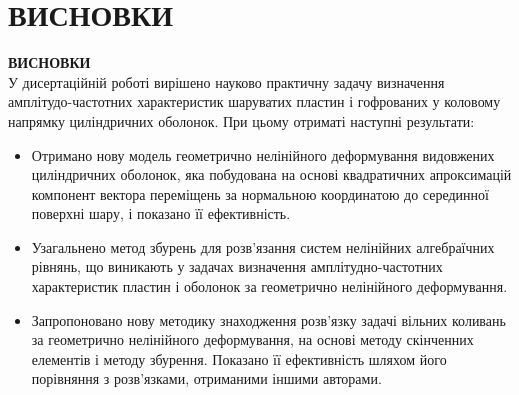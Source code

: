 \documentclass[8pt]{beamer}
\numberwithin{figure}{section}
\numberwithin{equation}{section}
\numberwithin{table}{section}
\begin{document}
\section{ВИСНОВКИ}
\begin{frame}
\textbf{\large ВИСНОВКИ}
\\
\vspace{0.2em}
У дисертаційній роботі вирішено науково практичну задачу визначення амплітудо-частотних характеристик шаруватих пластин і гофрованих у коловому напрямку циліндричних оболонок. При цьому отриматі наступні результати:
\begin{itemize}
\item Отримано нову модель геометрично нелінійного деформування видовжених циліндричних оболонок, яка побудована на основі квадратичних апроксимацій компонент вектора переміщень за нормальною координатою до серединної поверхні шару, і показано її ефективність.
\item Узагальнено метод збурень для розв'язання систем нелінійних алгебраїчних рівнянь, що виникають у задачах визначення амплітудно-частотних характеристик пластин і оболонок за геометрично нелінійного деформування.
\item Запропоновано нову методику знаходження розв’язку задачі вільних коливань за геометрично нелінійного деформування, на основі методу скінченних елементів і методу збурення. Показано її ефективність шляхом його порівняння з розв'язками, отриманими іншими авторами.
\end{itemize}
\end{frame}
\end{document}
